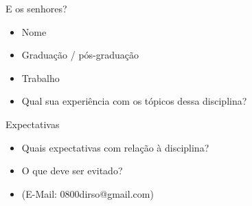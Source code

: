 \begin{frame}	
	\begin{block}{E os senhores?}
		\begin{itemize}
			\item Nome
			\item Graduação / pós-graduação
			\item Trabalho
			\item Qual sua experiência com os tópicos dessa disciplina?
		\end{itemize}
	\end{block}
\end{frame}

\begin{frame}	
	\begin{block}{Expectativas}
		\begin{itemize}
			\item Quais expectativas com relação à disciplina?
			\item O que deve ser evitado?
			\item (E-Mail: 0800dirso@gmail.com)
		\end{itemize}
	\end{block}
\end{frame}